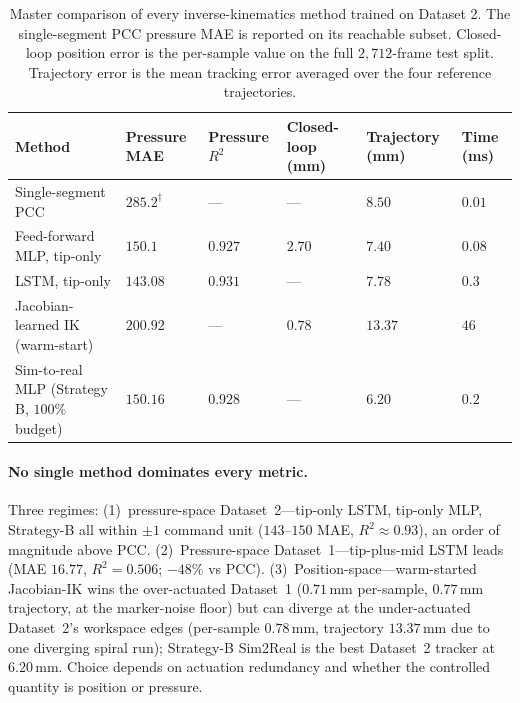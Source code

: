 \begin{table}[ht]
\centering
\caption[Master comparison on Dataset 2.]{Master comparison of every inverse-kinematics method trained on Dataset 2. The single-segment PCC pressure MAE is reported on its reachable subset. Closed-loop position error is the per-sample value on the full $2{,}712$-frame test split. Trajectory error is the mean tracking error averaged over the four reference trajectories.}
\label{tab:res_overall_ds2}
\begin{tabularx}{\linewidth}{@{}l X X X X X@{}}
\toprule
Method                                          & Pressure MAE        & Pressure $R^{2}$    & Closed-loop (mm)   & Trajectory (mm)            & Time (ms)           \\
\midrule
Single-segment PCC                               & $285.2^{\dagger}$    & ---                  & ---                 & $8.50$                      & $0.01$               \\
Feed-forward MLP, tip-only                       & $150.1$              & $0.927$              & $2.70$              & $7.40$                      & $0.08$               \\
LSTM, tip-only                                   & $\mathbf{143.08}$    & $\mathbf{0.931}$     & ---                 & $7.78$                      & $0.3$                \\
Jacobian-learned IK (warm-start)                 & $200.92$             & ---                  & $\mathbf{0.78}$     & $13.37$                     & $46$                 \\
Sim-to-real MLP (Strategy B, $100\%$ budget)     & $150.16$             & $0.928$              & ---                 & $\mathbf{6.20}$             & $0.2$                \\
\bottomrule
\end{tabularx}
\end{table}

\paragraph{No single method dominates every metric.}
Three regimes: (1)~pressure-space Dataset~2---tip-only LSTM, tip-only MLP, Strategy-B all within $\pm 1$ command unit ($143$--$150$ MAE, $R^{2} \approx 0.93$), an order of magnitude above PCC. (2)~Pressure-space Dataset~1---tip-plus-mid LSTM leads (MAE $16.77$, $R^{2} = 0.506$; $-48\%$ vs PCC). (3)~Position-space---warm-started Jacobian-IK wins the over-actuated Dataset~1 ($0.71$\,mm per-sample, $0.77$\,mm trajectory, at the marker-noise floor) but can diverge at the under-actuated Dataset~2's workspace edges (per-sample $0.78$\,mm, trajectory $13.37$\,mm due to one diverging spiral run); Strategy-B Sim2Real is the best Dataset~2 tracker at $6.20$\,mm. Choice depends on actuation redundancy and whether the controlled quantity is position or pressure.

